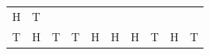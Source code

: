 {\begin{center}
\begin{xtabular*}{\mytablewidth}[t]{|p{10\mystarwidth}|p{10\mystarwidth}|p{10\mystarwidth}|p{10\mystarwidth}|p{10\mystarwidth}|p{10\mystarwidth}|p{10\mystarwidth}|p{10\mystarwidth}|p{10\mystarwidth}|p{10\mystarwidth}|}
        H &
        T%
     \tabularnewline{}
        T &
        H &
        T &
        T &
        H &
        H &
        H &
        T &
        H &
        T%

\end{xtabular*}
\end{center}}
